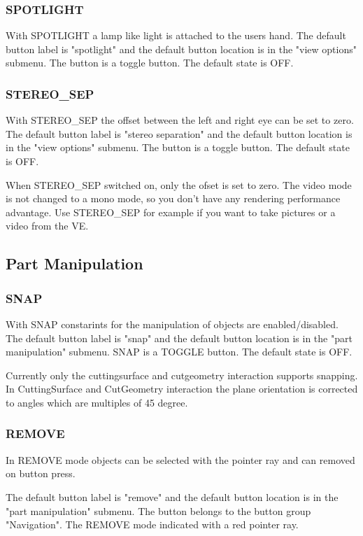  
\subsubsection{SPOTLIGHT}
With SPOTLIGHT a lamp like light is attached to the users hand.
The default button label is "spotlight" and
the default button location is in the "view options" submenu. 
The button is a toggle button. The default state is OFF.
		
\subsubsection{STEREO\_SEP}
With STEREO\_SEP the offset between the left and right eye can be set
to zero.
The default button label is "stereo separation" and
the default button location is in the "view options" submenu. 
The button is a toggle button. The default state is OFF.

When STEREO\_SEP switched on, only the ofset is set to zero. The video
mode is not changed to a mono mode, so you don't have any rendering
performance advantage. Use STEREO\_SEP for example if you want to take
pictures or a video from the VE.	

\subsection{Part Manipulation}

\subsubsection{SNAP}
With SNAP constarints for the manipulation of objects are enabled/disabled.
The default button label is "snap" and
the default button location is in the "part manipulation" submenu. 
SNAP is a TOGGLE button. The default state is OFF.

Currently only the cuttingsurface and cutgeometry interaction
supports snapping. In CuttingSurface and CutGeometry 
interaction the plane orientation
is corrected to angles which are multiples of 45 degree.
 
\subsubsection{REMOVE}
In REMOVE mode objects can be selected with the pointer ray and can
removed on button press.

The default button label is "remove" and
the default button location is in the "part manipulation" submenu. 
The button belongs to the button group "Navigation".
The REMOVE mode indicated with a red pointer ray.
 
